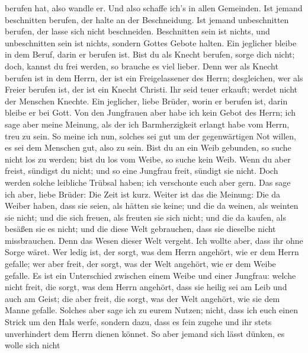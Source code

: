 berufen hat, also wandle er. Und also schaffe ich's in allen Gemeinden.
 Ist jemand beschnitten berufen, der halte an der
Beschneidung. Ist jemand unbeschnitten berufen, der lasse sich nicht
beschneiden.  Beschnitten sein ist nichts, und
unbeschnitten sein ist nichts, sondern Gottes Gebote halten.
 Ein jeglicher bleibe in dem Beruf, darin er berufen ist.
 Bist du als Knecht berufen, sorge dich nicht; doch,
kannst du frei werden, so brauche es viel lieber.  Denn
wer als Knecht berufen ist in dem Herrn, der ist ein Freigelassener des
Herrn; desgleichen, wer als Freier berufen ist, der ist ein Knecht
Christi.  Ihr seid teuer erkauft; werdet nicht der
Menschen Knechte.  Ein jeglicher, liebe Brüder, worin er
berufen ist, darin bleibe er bei Gott.  Von den
Jungfrauen aber habe ich kein Gebot des Herrn; ich sage aber meine
Meinung, als der ich Barmherzigkeit erlangt habe vom Herrn, treu zu
sein.  So meine ich nun, solches sei gut um der
gegenwärtigen Not willen, es sei dem Menschen gut, also zu sein.
 Bist du an ein Weib gebunden, so suche nicht los zu
werden; bist du los vom Weibe, so suche kein Weib.  Wenn
du aber freist, sündigst du nicht; und so eine Jungfrau freit, sündigt
sie nicht. Doch werden solche leibliche Trübsal haben; ich verschonte
euch aber gern.  Das sage ich aber, liebe Brüder: Die
Zeit ist kurz. Weiter ist das die Meinung: Die da Weiber haben, dass sie
seien, als hätten sie keine; und die da weinen, als weinten sie nicht;
 und die sich freuen, als freuten sie sich nicht; und die
da kaufen, als besäßen sie es nicht;  und die diese Welt
gebrauchen, dass sie dieselbe nicht missbrauchen. Denn das Wesen dieser
Welt vergeht.  Ich wollte aber, dass ihr ohne Sorge
wäret. Wer ledig ist, der sorgt, was dem Herrn angehört, wie er dem
Herrn gefalle;  wer aber freit, der sorgt, was der Welt
angehört, wie er dem Weibe gefalle. Es ist ein Unterschied zwischen
einem Weibe und einer Jungfrau:  welche nicht freit, die
sorgt, was dem Herrn angehört, dass sie heilig sei am Leib und auch am
Geist; die aber freit, die sorgt, was der Welt angehört, wie sie dem
Manne gefalle.  Solches aber sage ich zu eurem Nutzen;
nicht, dass ich euch einen Strick um den Hals werfe, sondern dazu, dass
es fein zugehe und ihr stets unverhindert dem Herrn dienen könnet.
 So aber jemand sich lässt dünken, es wolle sich nicht
